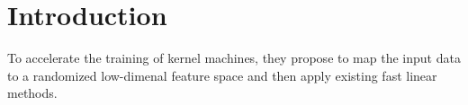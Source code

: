 \chapter{Introduction}

To accelerate the training of kernel machines, 
they propose to map the input data to a 
randomized low-dimenal  feature space and 
then apply existing fast linear methods.